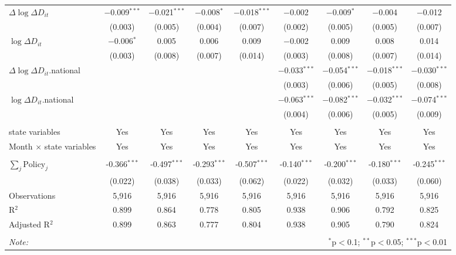 \begin{tabular}{@{\extracolsep{1pt}}lcccccccc}
  $\Delta \log \Delta D_{it}$ & $-$0.009$^{***}$ & $-$0.021$^{***}$ & $-$0.008$^{*}$ & $-$0.018$^{***}$ & $-$0.002 & $-$0.009$^{*}$ & $-$0.004 & $-$0.012 \\ 
  & (0.003) & (0.005) & (0.004) & (0.007) & (0.002) & (0.005) & (0.005) & (0.007) \\ 
  $\log \Delta D_{it}$ & $-$0.006$^{*}$ & 0.005 & 0.006 & 0.009 & $-$0.002 & 0.009 & 0.008 & 0.014 \\ 
  & (0.003) & (0.008) & (0.007) & (0.014) & (0.003) & (0.008) & (0.007) & (0.014) \\ 
  $\Delta \log \Delta D_{it}$.national &  &  &  &  & $-$0.033$^{***}$ & $-$0.054$^{***}$ & $-$0.018$^{***}$ & $-$0.030$^{***}$ \\ 
  &  &  &  &  & (0.003) & (0.006) & (0.005) & (0.008) \\ 
  $\log \Delta D_{it}$.national &  &  &  &  & $-$0.063$^{***}$ & $-$0.082$^{***}$ & $-$0.032$^{***}$ & $-$0.074$^{***}$ \\ 
  &  &  &  &  & (0.004) & (0.006) & (0.005) & (0.009) \\ 
 \hline \\[-1.8ex] 
state variables & Yes & Yes & Yes & Yes & Yes & Yes & Yes & Yes \\ 
Month $\times$ state variables & Yes & Yes & Yes & Yes & Yes & Yes & Yes & Yes \\ 
\hline \\[-1.8ex] 
$\sum_j \mathrm{Policy}_j$ & -0.366$^{***}$ & -0.497$^{***}$ & -0.293$^{***}$ & -0.507$^{***}$ & -0.140$^{***}$ & -0.200$^{***}$ & -0.180$^{***}$ & -0.245$^{***}$ \\ 
 & (0.022) & (0.038) & (0.033) & (0.062) & (0.022) & (0.032) & (0.033) & (0.060) \\ 
Observations & 5,916 & 5,916 & 5,916 & 5,916 & 5,916 & 5,916 & 5,916 & 5,916 \\ 
R$^{2}$ & 0.899 & 0.864 & 0.778 & 0.805 & 0.938 & 0.906 & 0.792 & 0.825 \\ 
Adjusted R$^{2}$ & 0.899 & 0.863 & 0.777 & 0.804 & 0.938 & 0.905 & 0.790 & 0.824 \\ 
\hline 
\hline \\[-1.8ex] 
\textit{Note:}  & \multicolumn{8}{r}{$^{*}$p$<$0.1; $^{**}$p$<$0.05; $^{***}$p$<$0.01} \\ 
\end{tabular} 